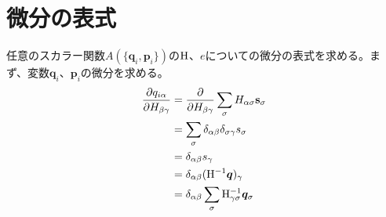 \documentclass[11pt,a4paper,uplatex]{jsarticle}
\begin{document}
\section{微分の表式}
任意のスカラー関数$A(\{\bm{q}_{i}, \bm{p}_{i}\})$の${\rm H}$、$e$についての微分の表式を求める。まず、変数$\bm{q}_{i}$、$\bm{p}_{i}$の微分を求める。
\begin{align}
    \frac{\partial q_{i \alpha}}{\partial H_{\beta \gamma}} 
    &= \frac{\partial}{\partial H_{\beta \gamma}} \sum_{\sigma} H_{\alpha \sigma} \bf{s}_{\sigma} \\
    &= \sum_{\sigma} \delta_{\alpha \beta} \delta_{\sigma \gamma} s_{\sigma} \\
    &= \delta_{\alpha \beta} s_{\gamma} \\
    &= \delta_{\alpha \beta} ({\rm H}^{-1} \bm{q})_{\gamma} \\
    &= \delta_{\alpha \beta} \sum_{\sigma} {\rm H}^{-1}_{\gamma \sigma} \bm{q}_{\sigma}
\end{align}
\end{document}
